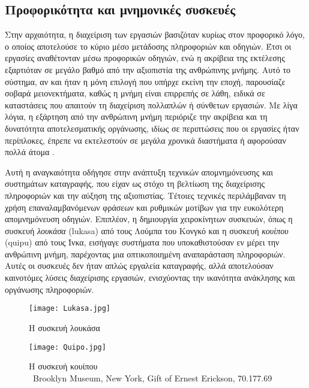         \subsection{Προφορικότητα και μνημονικές συσκευές}
            Στην αρχαιότητα, η διαχείριση των εργασιών βασιζόταν κυρίως στον προφορικό λόγο, ο οποίος αποτελούσε το κύριο μέσο μετάδοσης πληροφοριών και οδηγιών. Έτσι οι εργασίες αναθέτονταν μέσω προφορικών οδηγιών, ενώ η ακρίβεια της εκτέλεσης εξαρτιόταν σε μεγάλο βαθμό από την αξιοπιστία της ανθρώπινης μνήμης. Αυτό το σύστημα, αν και ήταν η μόνη επιλογή που υπήρχε εκείνη την εποχή, παρουσίαζε σοβαρά μειονεκτήματα, καθώς η μνήμη είναι επιρρεπής σε λάθη, ειδικά σε καταστάσεις που απαιτούν τη διαχείριση πολλαπλών ή σύνθετων εργασιών. Με λίγα λόγια, η εξάρτηση από την ανθρώπινη μνήμη περιόριζε την ακρίβεια και τη δυνατότητα αποτελεσματικής οργάνωσης, ιδίως σε περιπτώσεις που οι εργασίες ήταν περίπλοκες, έπρεπε να εκτελεστούν σε μεγάλα χρονικά διαστήματα ή αφορούσαν πολλά άτομα \cite{Goody2013}.

            Αυτή η αναγκαιότητα οδήγησε στην ανάπτυξη τεχνικών απομνημόνευσης και συστημάτων καταγραφής, που είχαν ως στόχο τη βελτίωση της διαχείρισης πληροφοριών και την αύξηση της αξιοπιστίας. Τέτοιες τεχνικές περιλάμβαναν τη χρήση επαναλαμβανόμενων φράσεων και ρυθμικών μοτίβων για την ευκολότερη απομνημόνευση οδηγιών. Επιπλέον, η δημιουργία χειροκίνητων συσκευών, όπως η συσκευή \textit{λουκάσα} (lukasa) από τους Λούμπα του Κονγκό και η συσκευή \textit{κουίπου} (quipu) από τους Ίνκα, εισήγαγε συστήματα που υποκαθιστούσαν εν μέρει την ανθρώπινη μνήμη, παρέχοντας μια οπτικοποιημένη αναπαράσταση πληροφοριών. Αυτές οι συσκευές δεν ήταν απλώς εργαλεία καταγραφής, αλλά αποτελούσαν καινοτόμες λύσεις διαχείρισης εργασιών, ενισχύοντας την ικανότητα ανάκλησης και οργάνωσης πληροφοριών.

            \begin{figure}[h!] \noindent \centering
                \texttt{[image: Lukasa.jpg]}
                \caption{Η συσκευή λουκάσα \cite{Lukasa}}
                \label{fig:Lukasa}
            \end{figure}

            \begin{figure}[h!] \noindent \centering
                \texttt{[image: Quipo.jpg]}
                \caption{\centering Η συσκευή κουίπου \\ {\footnotesize \textcopyright\ Brooklyn Museum, New York, Gift of Ernest Erickson, 70.177.69}}
                \label{fig:Quipo}
            \end{figure}

